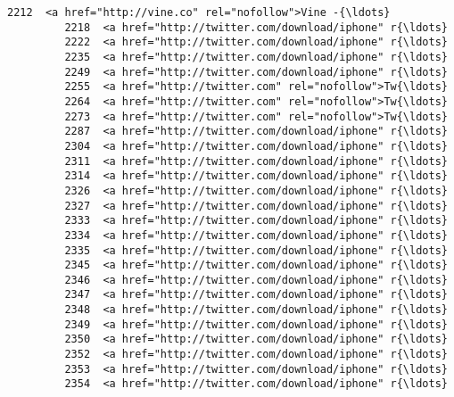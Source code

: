 \documentclass[11pt]{article}
\begin{document}
\begin{Verbatim}[commandchars=\\\{\}]
         2212  <a href="http://vine.co" rel="nofollow">Vine -{\ldots}   
         2218  <a href="http://twitter.com/download/iphone" r{\ldots}   
         2222  <a href="http://twitter.com/download/iphone" r{\ldots}   
         2235  <a href="http://twitter.com/download/iphone" r{\ldots}   
         2249  <a href="http://twitter.com/download/iphone" r{\ldots}   
         2255  <a href="http://twitter.com" rel="nofollow">Tw{\ldots}   
         2264  <a href="http://twitter.com" rel="nofollow">Tw{\ldots}   
         2273  <a href="http://twitter.com" rel="nofollow">Tw{\ldots}   
         2287  <a href="http://twitter.com/download/iphone" r{\ldots}   
         2304  <a href="http://twitter.com/download/iphone" r{\ldots}   
         2311  <a href="http://twitter.com/download/iphone" r{\ldots}   
         2314  <a href="http://twitter.com/download/iphone" r{\ldots}   
         2326  <a href="http://twitter.com/download/iphone" r{\ldots}   
         2327  <a href="http://twitter.com/download/iphone" r{\ldots}   
         2333  <a href="http://twitter.com/download/iphone" r{\ldots}   
         2334  <a href="http://twitter.com/download/iphone" r{\ldots}   
         2335  <a href="http://twitter.com/download/iphone" r{\ldots}   
         2345  <a href="http://twitter.com/download/iphone" r{\ldots}   
         2346  <a href="http://twitter.com/download/iphone" r{\ldots}   
         2347  <a href="http://twitter.com/download/iphone" r{\ldots}   
         2348  <a href="http://twitter.com/download/iphone" r{\ldots}   
         2349  <a href="http://twitter.com/download/iphone" r{\ldots}   
         2350  <a href="http://twitter.com/download/iphone" r{\ldots}   
         2352  <a href="http://twitter.com/download/iphone" r{\ldots}   
         2353  <a href="http://twitter.com/download/iphone" r{\ldots}   
         2354  <a href="http://twitter.com/download/iphone" r{\ldots}   
         

\end{Verbatim}
\end{document}
